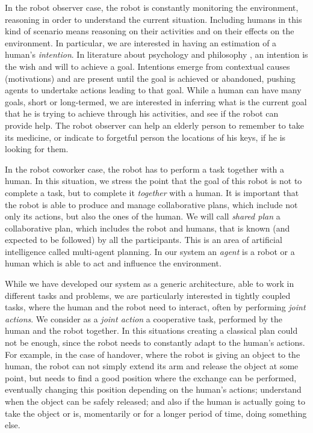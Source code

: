 In the robot observer case, the robot is constantly monitoring the environment, reasoning in order to understand the current situation.  Including humans in this kind of scenario means reasoning on their activities and on their effects on the environment. In particular, we are interested in having an estimation of a human's \textit{intention}. In literature about psychology \citep{bruner1981} and philosophy \citep{bratman1984}, an intention is the wish and will to achieve a goal. Intentions emerge from contextual causes (motivations) and are present until the goal is achieved or abandoned, pushing agents to undertake actions leading to that goal. While a human can have many goals, short or long-termed, we are interested in inferring what is the current goal that he is trying to achieve through his activities, and see if the robot can provide help. The robot observer can help an elderly person to remember to take its medicine, or indicate to forgetful person the locations of his keys, if he is looking for them.

In the robot coworker case, the robot has to perform a task together with a human. In this situation, we stress the point that the goal of this robot is not to complete a task, but to complete it \textit{together} with a human.  It is important that the robot is able to produce and manage collaborative plans, which include not only its actions, but also the ones of the human. We will call \textit{shared plan} a collaborative plan, which includes the robot and humans, that is known (and expected to be followed) by all the participants.
This is an area of artificial intelligence called multi-agent planning. In our system an \textit{agent} is a robot or a human which is able to act and influence the environment. 

While we have developed our system as a generic architecture, able to work in different tasks and problems, we are particularly interested in tightly coupled tasks, where the human and the robot need to interact, often by performing \textit{joint actions}. We consider as a \textit{joint action} a cooperative task, performed by the human and the robot together. In this situations creating a classical plan could not be enough, since the robot needs to constantly adapt to the human's actions. For example, in the case of handover, where the robot is giving an object to the human, the robot can not simply extend its arm and release the object at some point, but needs to find a good position where the exchange can be performed, eventually changing this position depending on the human's actions; understand when the object can be safely released; and also if the human is actually going to take the object or is, momentarily or for a longer period of time, doing something else.

